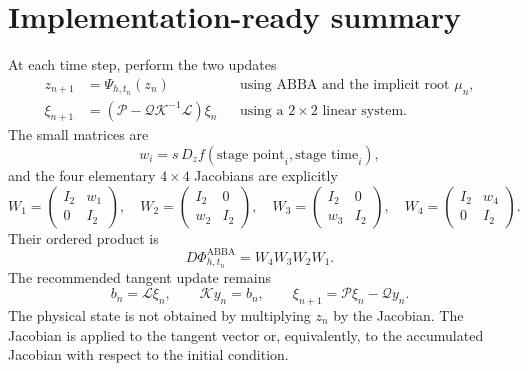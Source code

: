 \documentclass[11pt,a4paper]{article}
\newcommand{\PhiAB}{\Phi^{\mathrm{ABBA}}_{h,t_n}}
\begin{document}
\section{Implementation-ready summary}

At each time step, perform the two updates
\[
 \boxed{
 \begin{aligned}
 z_{n+1}&=\Psi_{h,t_n}(z_n)
 &&\text{using ABBA and the implicit root }\mu_n,\\[1mm]
 \xi_{n+1}&=
 \left(\mathcal P-\mathcal Q\mathcal K^{-1}\mathcal L\right)\xi_n
 &&\text{using a }2\times2\text{ linear system}.
 \end{aligned}
 }
\]
The small matrices are
\[
 w_i=s\,D_zf(\text{stage point}_i,\text{stage time}_i),
\]
and the four elementary $4\times4$ Jacobians are explicitly
\[
 \boxed{
 W_1=\begin{pmatrix}I_2&w_1\\0&I_2\end{pmatrix},\quad
 W_2=\begin{pmatrix}I_2&0\\w_2&I_2\end{pmatrix},\quad
 W_3=\begin{pmatrix}I_2&0\\w_3&I_2\end{pmatrix},\quad
 W_4=\begin{pmatrix}I_2&w_4\\0&I_2\end{pmatrix}.
 }
\]
Their ordered product is
\[
 D\PhiAB=W_4W_3W_2W_1.
\]
The recommended tangent update remains
\[
 b_n=\mathcal L\xi_n,
 \qquad
 \mathcal K y_n=b_n,
 \qquad
 \xi_{n+1}=\mathcal P\xi_n-\mathcal Qy_n.
\]
The physical state is not obtained by multiplying $z_n$ by the Jacobian. The Jacobian is
applied to the tangent vector or, equivalently, to the accumulated Jacobian with respect
to the initial condition.
\end{document}
